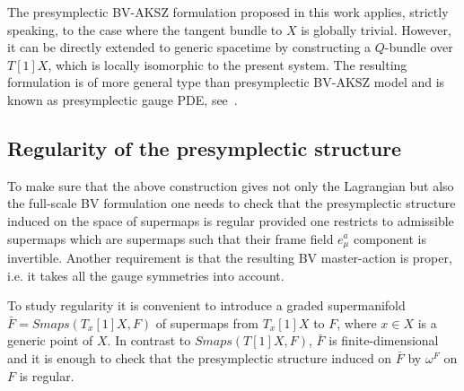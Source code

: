 \documentclass[a4paper,12pt]{article}
\numberwithin{equation}{section} %
\numberwithin{equation}{section}
\begin{document}
The presymplectic BV-AKSZ formulation proposed in this work applies, strictly speaking,  to the case where the tangent bundle to $X$ is globally trivial. However, it can be directly extended to generic spacetime by constructing a $Q$-bundle over $T[1]X$, which is locally isomorphic to the present system. The resulting formulation is of more general type than presymplectic BV-AKSZ model and is known as presymplectic gauge PDE, see~\cite{Grigoriev:2022zlq,Dneprov:2024cvt}.


\subsection{Regularity of the presymplectic structure}
To make sure that the above construction gives not only the Lagrangian but also the full-scale BV formulation one needs to check that the presymplectic structure induced on the space of supermaps is regular provided one restricts to admissible supermaps which are  supermaps such that their frame field $e_\mu^a$ component is invertible. Another requirement is that the resulting BV master-action is proper, i.e. it takes all the gauge symmetries into account.

To study regularity it is convenient to introduce a graded supermanifold $\bar F=Smaps(T_x[1]X,F)$ of supermaps from $T_x[1]X$ to $F$, where $x\in X$ is a generic point of $X$. In contrast to $Smaps(T[1]X,F)$, $\bar F$ is finite-dimensional and it is enough to check that the presymplectic structure induced on $\bar F$ by $\omega^F$ on $F$ is regular. 
\end{document}
